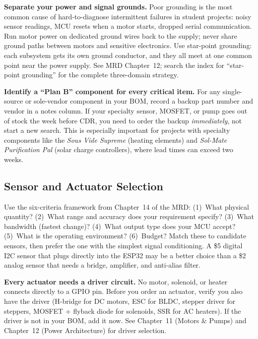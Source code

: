 \begin{warnbox}
\textbf{Separate your power and signal grounds.} Poor grounding is the most common cause of hard-to-diagnose intermittent failures in student projects: noisy sensor readings, MCU resets when a motor starts, dropped serial communication. Run motor power on dedicated ground wires back to the supply; never share ground paths between motors and sensitive electronics. Use star-point grounding: each subsystem gets its own ground conductor, and they all meet at one common point near the power supply. See MRD Chapter~12; search the index for ``star-point grounding'' for the complete three-domain strategy.
\end{warnbox}

\begin{tipbox}
\textbf{Identify a ``Plan B'' component for every critical item.} For any single-source or sole-vendor component in your BOM, record a backup part number and vendor in a notes column. If your specialty sensor, MOSFET, or pump goes out of stock the week before CDR, you need to order the backup \textit{immediately}, not start a new search. This is especially important for projects with specialty components like the \textit{Sous Vide Supreme} (heating elements) and \textit{Sol-Mate Purification Pal} (solar charge controllers), where lead times can exceed two weeks.
\end{tipbox}

\subsection{Sensor and Actuator Selection}

\begin{faqbox}
Use the six-criteria framework from Chapter~14 of the MRD: (1)~What physical quantity? (2)~What range and accuracy does your requirement specify? (3)~What bandwidth (fastest change)? (4)~What output type does your MCU accept? (5)~What is the operating environment? (6)~Budget? Match these to candidate sensors, then prefer the one with the simplest signal conditioning. A \$5 digital I2C sensor that plugs directly into the ESP32 may be a better choice than a \$2 analog sensor that needs a bridge, amplifier, and anti-alias filter.
\end{faqbox}

\begin{warnbox}
\textbf{Every actuator needs a driver circuit.} No motor, solenoid, or heater connects directly to a GPIO pin. Before you order an actuator, verify you also have the driver (H-bridge for DC motors, ESC for BLDC, stepper driver for steppers, MOSFET + flyback diode for solenoids, SSR for AC heaters). If the driver is not in your BOM, add it now. See Chapter~11 (Motors \& Pumps) and Chapter~12 (Power Architecture) for driver selection.
\end{warnbox}

